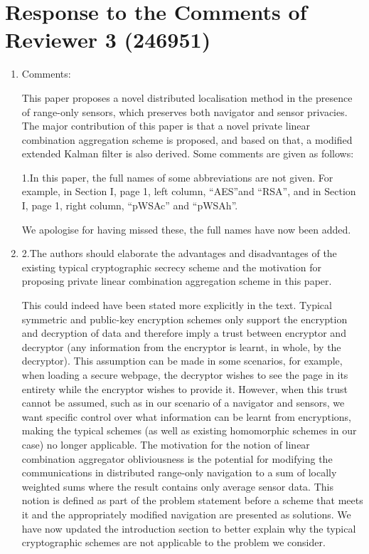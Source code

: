 \documentclass[a4paper]{scrartcl}
\newenvironment{rebuttal}{\begin{enumerate}[label={\color{grey}\thesection.\arabic{enumi}},leftmargin=0pt,ref=\thesection.\arabic{enumi}]}{\end{enumerate}}
\newcommand{\reviewtext}[1]{{\color{nblue} #1}}
\begin{document}
\section*{Response to the Comments of Reviewer 3 (246951)}
\def\thesection{R3}
\begin{rebuttal}
\item \reviewtext{Comments:

This paper proposes a novel distributed localisation method in the presence of range-only sensors, which preserves both navigator and sensor privacies. The major contribution of this paper is that a novel private linear combination aggregation scheme is proposed, and based on that, a modified extended Kalman filter is also derived. Some comments are given as follows:

1.In this paper, the full names of some abbreviations are not given. For example, in Section I, page 1, left column, “AES”and “RSA”, and in Section I, page 1, right column, “pWSAc” and “pWSAh”.}

We apologise for having missed these, the full names have now been added.

\item \reviewtext{2.The authors should elaborate the advantages and disadvantages of the existing typical cryptographic secrecy scheme and the motivation for proposing private linear combination aggregation scheme in this paper.}

This could indeed have been stated more explicitly in the text. Typical symmetric and public-key encryption schemes only support the encryption and decryption of data and therefore imply a trust between encryptor and decryptor (any information from the encryptor is learnt, in whole, by the decryptor). This assumption can be made in some scenarios, for example, when loading a secure webpage, the decryptor wishes to see the page in its entirety while the encryptor wishes to provide it. However, when this trust cannot be assumed, such as in our scenario of a navigator and sensors, we want specific control over what information can be learnt from encryptions, making the typical schemes (as well as existing homomorphic schemes in our case) no longer applicable. The motivation for the notion of linear combination aggregator obliviousness is the potential for modifying the communications in distributed range-only navigation to a sum of locally weighted sums where the result contains only average sensor data. This notion is defined as part of the problem statement before a scheme that meets it and the appropriately modified navigation are presented as solutions. We have now updated the introduction section to better explain why the typical cryptographic schemes are not applicable to the problem we consider.


\end{rebuttal}
\end{document}
